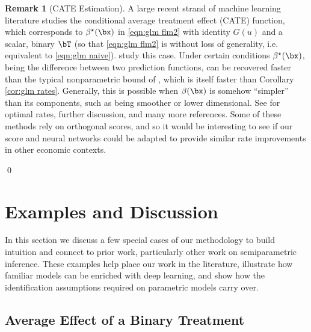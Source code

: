 \documentclass[12pt]{article}
\numberwithin{equation}{section}
\theoremstyle{definition}
\newtheorem{remarkTmp}{Remark}
\newenvironment{remark}
	{\medskip  \begin{remarkTmp} 	}
	{ 
		\renewcommand{\qedsymbol}{$\clubsuit$}
		\qed 
		\end{remarkTmp} 
	}
\newcommand{\btrue}{\beta^\star}
\begin{document}
\begin{appendices}
\begin{remark}[CATE Estimation]
    \label{rem:CATE}
    A large recent strand of machine learning literature studies the conditional average treatment effect (CATE) function, which corresponds to $\btrue(\bx)$ in \eqref{eqn:glm flm2} with identity $G(u)$ and a scalar, binary $\bT$ (so that \eqref{eqn:glm flm2} is without loss of generality, i.e. equivalent to \eqref{eqn:glm naive}). \cite{Farrell-Liang-Misra2021_Ecma} study this case. Under certain conditions $\btrue(\bx)$, being the difference between two prediction functions, can be recovered faster than the typical nonparametric bound of \cite{stone1982optimal}, which is itself faster than Corollary \ref{cor:glm rates}. Generally, this is possible when $\beta(\bx)$ is somehow ``simpler'' than its components, such as being smoother or lower dimensional. See \cite{Kennedy-Balakrishnan-Robins-Wasserman2024_AoS} for optimal rates, further discussion, and many more references. Some of these methods rely on orthogonal scores, and so it would be interesting to see if our score and neural networks could be adapted to provide similar rate improvements in other economic contexts.
\end{remark}









\section{Examples and Discussion}
    \label{appx:examples}


In this section we discuss a few special cases of our methodology to build intuition and connect to prior work, particularly other work on semiparametric inference. These examples help place our work in the literature, illustrate how familiar models can be enriched with deep learning, and show how the identification assumptions required on parametric models carry over. 



\subsection{Average Effect of a Binary Treatment}
    \label{appx:ATE}



\end{appendices}
\end{document}
